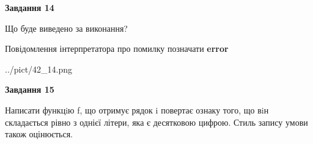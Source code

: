 \documentclass[11pt, ukrainian]{article}
\begin{document}
{\begin {large}
{\begin {center}\textbf{Завдання 14}\end {center}}\par
Що буде виведено за виконання? \par
Повідомлення інтерпретатора про помилку позначати \textbf{error}

\begin{center}
	{../pict/42_14.png}
\end{center}
\newpage

{\begin {center}\textbf{Завдання 15}\end {center}}\par

Написати функцiю f, що отримує рядок i повертає ознаку того, що вiн складається рівно з однієї літери, яка є десятковою цифрою. Стиль запису умови також оцінюється.\par
\newpage

\end {large}}
\end{document}
